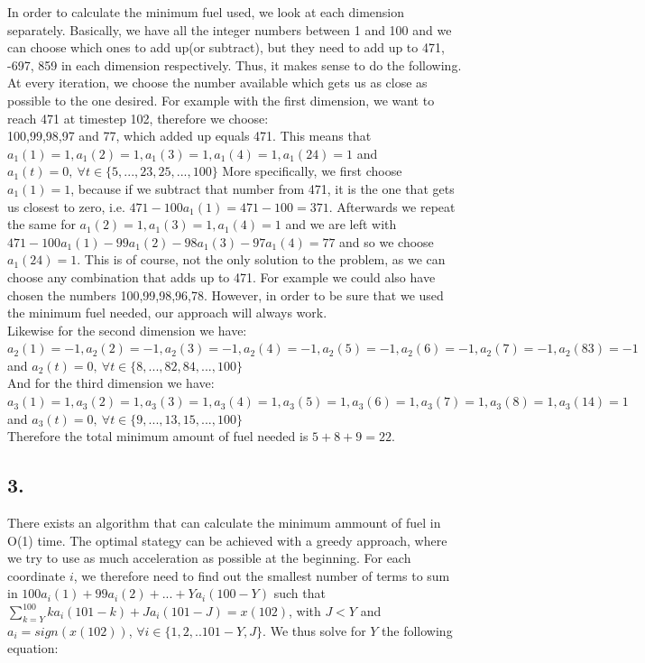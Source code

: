 \documentclass[11pt,a4paper,oneside]{report}
\begin{document}
In order to calculate the minimum fuel used, we look at each dimension separately. Basically, we have all the integer numbers between 1 and 100 and we can choose which ones to add up(or subtract), but they need to add up to 471, -697, 859 in each dimension respectively. Thus, it makes sense to do the following. At every iteration, we choose the number available which gets us as close as possible to the one desired. For example with the first dimension, we want to reach 471 at timestep 102, therefore we choose:\\
100,99,98,97 and 77, which added up equals 471. This means that $a_1(1)=1, a_1(2)=1, a_1(3)=1,a_1(4)=1,a_1(24)=1$ and $a_1(t) = 0,\ \forall t \in \{5,...,23,25,...,100\}$
More specifically, we first choose $a_1(1) = 1$, because if we subtract that number from 471, it is the one that gets us closest to zero, i.e. $471-100a_1(1) = 471-100=371$. Afterwards we repeat the same for $a_1(2)=1, a_1(3)=1,a_1(4)=1$ and we are left with $471-100a_1(1)-99a_1(2)-98a_1(3)-97a_1(4)=77$ and so we choose $a_1(24)=1$. This is of course, not the only solution to the problem, as we can choose any combination that adds up to 471. For example we could also have chosen the numbers 100,99,98,96,78. However, in order to be sure that we used the minimum fuel needed, our approach will always work.\\
Likewise for the second dimension we have:\\
$a_2(1)=-1,a_2(2)=-1,a_2(3)=-1,a_2(4)=-1,a_2(5)=-1,a_2(6)=-1,a_2(7)=-1,a_2(83)=-1$ and $a_2(t)=0,\ \forall t\in \{8,...,82,84,...,100\}$\\
And for the third dimension we have:\\
$a_3(1)=1,a_3(2)=1,a_3(3)=1,a_3(4)=1,a_3(5)=1,a_3(6)=1,a_3(7)=1,a_3(8)=1,a_3(14)=1$ and $a_3(t)=0,\ \forall t\in \{9,...,13,15,...,100\}$\\

Therefore the total minimum amount of fuel needed is $5+8+9=22$.\\

\subsection*{3.}

There exists an algorithm that can calculate the minimum ammount of fuel in O(1) time. The optimal stategy can be achieved with a greedy approach, where we try to use as much acceleration as possible at the beginning. For each coordinate $i$, we therefore need to find out the smallest number of terms to sum in $100a_i(1)+99a_i(2) + ... + Ya_{i}(100-Y)$ such that $\sum_{k=Y}^{100}ka_{i}(101-k) + Ja_i(101-J) = x(102)$, with $J < Y$ and $a_i = sign(x(102))$, $\forall i \in \{1,2, .. 101-Y, J\}$. We thus solve for $Y$ the following equation:
\end{document}
